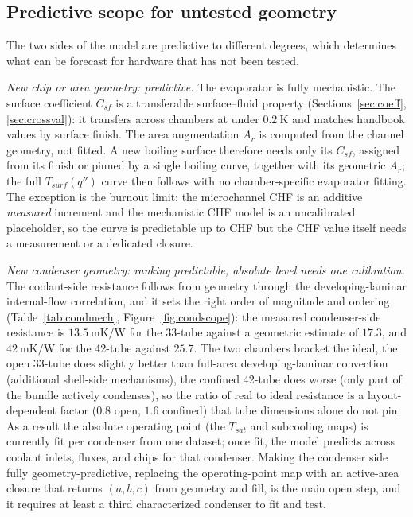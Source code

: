 \documentclass[11pt]{article}
\begin{document}
\subsection{Predictive scope for untested geometry}
\label{sec:scope}
The two sides of the model are predictive to different degrees, which determines what can be
forecast for hardware that has not been tested.

\textit{New chip or area geometry: predictive.} The evaporator is fully mechanistic. The
surface coefficient $C_{sf}$ is a transferable surface--fluid property (Sections~\ref{sec:coeff},
\ref{sec:crossval}): it transfers across chambers at under $0.2~\mathrm{K}$ and matches handbook
values by surface finish. The area augmentation $A_r$ is computed from the channel geometry, not
fitted. A new boiling surface therefore needs only its $C_{sf}$, assigned from its finish or pinned
by a single boiling curve, together with its geometric $A_r$; the full $T_{surf}(q'')$ curve then
follows with no chamber-specific evaporator fitting. The exception is the burnout limit: the
microchannel CHF is an additive \emph{measured} increment and the mechanistic CHF model is an
uncalibrated placeholder, so the curve is predictable up to CHF but the CHF value itself needs a
measurement or a dedicated closure.

\textit{New condenser geometry: ranking predictable, absolute level needs one calibration.}
The coolant-side resistance follows from geometry through the developing-laminar internal-flow
correlation, and it sets the right order of magnitude and ordering
(Table~\ref{tab:condmech}, Figure~\ref{fig:condscope}): the measured condenser-side resistance is
$13.5~\mathrm{mK/W}$ for the 33-tube against a geometric estimate of $17.3$, and $42~\mathrm{mK/W}$
for the 42-tube against $25.7$. The two chambers bracket the ideal, the open 33-tube does
slightly better than full-area developing-laminar convection (additional shell-side mechanisms),
the confined 42-tube does worse (only part of the bundle actively condenses), so the ratio of
real to ideal resistance is a layout-dependent factor ($0.8$ open, $1.6$ confined) that tube
dimensions alone do not pin. As a result the absolute operating point (the $T_{sat}$ and subcooling
maps) is currently fit per condenser from one dataset; once fit, the model predicts across coolant
inlets, fluxes, and chips for that condenser. Making the condenser side fully geometry-predictive, replacing the operating-point map with an active-area closure that returns $(a,b,c)$ from
geometry and fill, is the main open step, and it requires at least a third characterized
condenser to fit and test.
\end{document}

